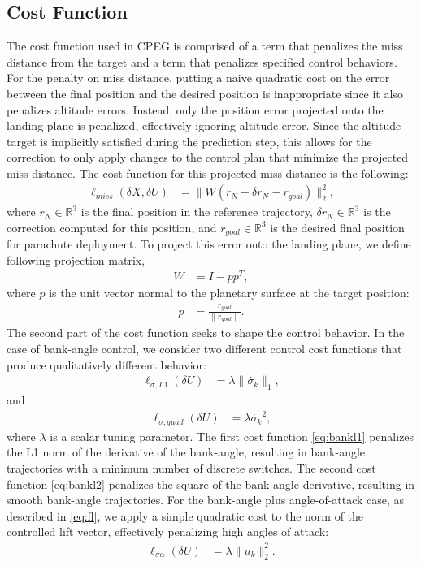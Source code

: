 \subsection{Cost Function}
The cost function used in CPEG is comprised of a term that penalizes the miss distance from the target and a term that penalizes specified control behaviors. For the penalty on miss distance, putting a naive quadratic cost on the error between the final position and the desired position is inappropriate since it also penalizes altitude errors. Instead, only the position error projected onto the landing plane is penalized, effectively ignoring altitude error. Since the altitude target is implicitly satisfied during the prediction step, this allows for the correction to only apply changes to the control plan that minimize the projected miss distance. The cost function for this projected miss distance is the following:
\begin{align}
\ell_{miss}(\delta X,\delta U) &= \|W( r_N + \delta r_N - r_{goal})\|_2^2 ,\label{eq:miss}
\end{align}
where $r_N \in {\mathbb{R}}^3$ is the  final position in the reference trajectory, $\delta r_N \in {\mathbb{R}}^3$ is the correction computed for this position, and $r_{goal} \in {\mathbb{R}}^3$ is the desired final position for parachute deployment. To project this error onto the landing plane, we define following projection matrix, 
\begin{align}
W &= I - pp^T,
\end{align}
where $p$ is the unit vector normal to the planetary surface at the target position:
\begin{align}
p &= \frac{r_{goal}}{\|r_{goal}\|}.
\end{align}
The second part of the cost function seeks to shape the control behavior. In the case of bank-angle control, we consider two different control cost functions that produce qualitatively different behavior:
\begin{align}
    \ell_{\sigma,L1}(\delta U) &= \lambda \|\dot{\sigma_k}\|_1, \label{eq:bankl1}
\end{align}
and
\begin{align}
    \ell_{\sigma,quad}(\delta U) &= \lambda \dot{\sigma_k}^2, \label{eq:bankl2}
\end{align}
where $\lambda$ is a scalar tuning parameter. The first cost function \eqref{eq:bankl1} penalizes the L1 norm of the derivative of the bank-angle, resulting in bank-angle trajectories with a minimum number of discrete switches. The second cost function \eqref{eq:bankl2} penalizes the square of the bank-angle derivative, resulting in smooth bank-angle trajectories. For the bank-angle plus angle-of-attack case, as described in \eqref{eq:fl}, we apply a simple quadratic cost to the norm of the controlled lift vector, effectively penalizing high angles of attack:
\begin{align}
    \ell_{\sigma \alpha}(\delta U) &= \lambda \|u_k\|_2^2. \label{eq:baoa_cost}
\end{align}
